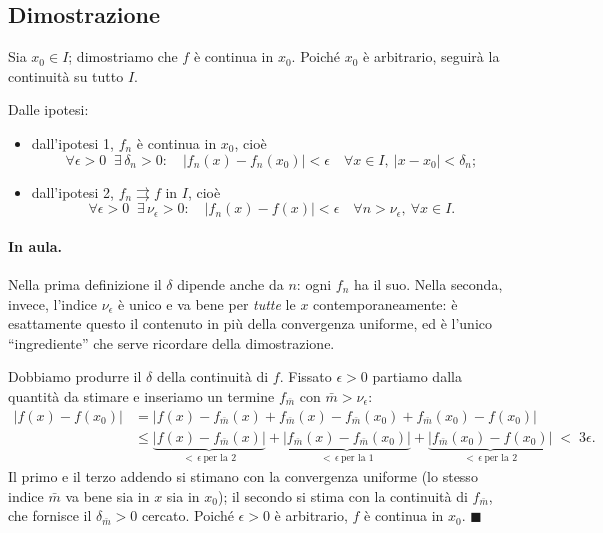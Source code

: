 \subsection{Dimostrazione}

Sia $x_0\in I$; dimostriamo che $f$ è continua in $x_0$. Poiché $x_0$ è arbitrario,
seguirà la continuità su tutto $I$.

Dalle ipotesi:
\begin{itemize}
  \item dall'ipotesi 1, $f_n$ è continua in $x_0$, cioè
  \[
  \forall \epsilon>0 \;\; \exists\, \delta_n>0:\quad
  |f_n(x)-f_n(x_0)|<\epsilon \quad \forall x\in I,\ |x-x_0|<\delta_n;
  \]
  \item dall'ipotesi 2, $f_n\rightrightarrows f$ in $I$, cioè
  \[
  \forall \epsilon>0 \;\; \exists\, \nu_\epsilon>0:\quad
  |f_n(x)-f(x)|<\epsilon \quad \forall n>\nu_\epsilon,\ \forall x\in I.
  \]
\end{itemize}

\paragraph{In aula.} Nella prima definizione il $\delta$ dipende anche da $n$: ogni
$f_n$ ha il suo. Nella seconda, invece, l'indice $\nu_\epsilon$ è unico e va bene per
\emph{tutte} le $x$ contemporaneamente: è esattamente questo il contenuto in più
della convergenza uniforme, ed è l'unico ``ingrediente'' che serve ricordare della
dimostrazione.

Dobbiamo produrre il $\delta$ della continuità di $f$. Fissato $\epsilon>0$ partiamo
dalla quantità da stimare e inseriamo un termine $f_{\bar m}$ con
$\bar m>\nu_\epsilon$:
\begin{align*}
|f(x)-f(x_0)|
&= \big| f(x)-f_{\bar m}(x)+f_{\bar m}(x)-f_{\bar m}(x_0)+f_{\bar m}(x_0)-f(x_0)\big|\\
&\le \underbrace{|f(x)-f_{\bar m}(x)|}_{<\,\epsilon \ \text{per la 2}}
+\underbrace{|f_{\bar m}(x)-f_{\bar m}(x_0)|}_{<\,\epsilon \ \text{per la 1}}
+\underbrace{|f_{\bar m}(x_0)-f(x_0)|}_{<\,\epsilon \ \text{per la 2}}
\;<\;3\epsilon .
\end{align*}
Il primo e il terzo addendo si stimano con la convergenza uniforme (lo stesso indice
$\bar m$ va bene sia in $x$ sia in $x_0$); il secondo si stima con la continuità di
$f_{\bar m}$, che fornisce il $\delta_{\bar m}>0$ cercato. Poiché $\epsilon>0$ è
arbitrario, $f$ è continua in $x_0$. $\blacksquare$


